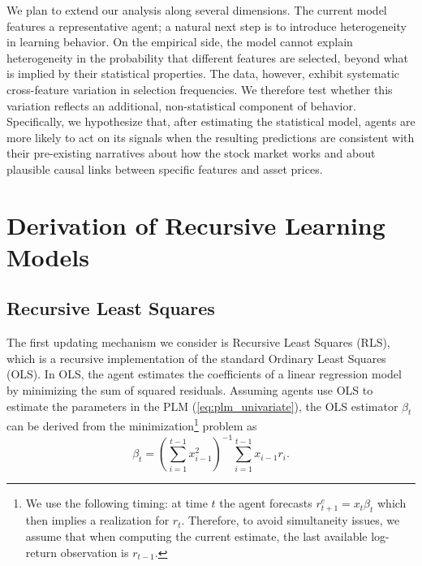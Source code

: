 \documentclass[11pt]{article}
\begin{document}
We plan to extend our analysis along several dimensions.
The current model features a representative agent; a natural next step is to introduce heterogeneity in learning behavior.
On the empirical side, the model cannot explain heterogeneity in the probability that different features are selected, beyond what is implied by their statistical properties. 
The data, however, exhibit systematic cross-feature variation in selection frequencies. 
We therefore test whether this variation reflects an additional, non-statistical component of behavior. 
Specifically, we hypothesize that, after estimating the statistical model, agents are more likely to act on its signals when the resulting predictions are consistent with their pre-existing narratives about how the stock market works and about plausible causal links between specific features and asset prices.




\newpage



\newpage

\appendix

\section{Derivation of Recursive Learning Models}\label{sec:appendix_learning}
\subsection{Recursive Least Squares}\label{app:RLS}

The first updating mechanism we consider is Recursive Least Squares (RLS), which is a recursive implementation of the standard Ordinary Least Squares (OLS).
In OLS, the agent estimates the coefficients of a linear regression model by minimizing the sum of squared residuals.
Assuming agents use OLS to estimate the parameters in the PLM (\ref{eq:plm_univariate}), the OLS estimator $\beta_t$ can be derived from the minimization\footnote{
We use the following timing:
at time $t$ the agent forecasts $r^e_{t+1} = x_t \beta_{t}$ which then implies a realization for $r_t$. 
Therefore, to avoid simultaneity issues, we assume that when computing the current estimate, the last available log-return observation is $r_{t-1}$.
} problem as
\begin{equation}
     \beta_t = \left(\sum^{t-1}_{i=1}  x_{i-1}^2 \right)^{-1} \sum^{t-1}_{i=1}  x_{i-1} r_i.
\end{equation}
\end{document}
